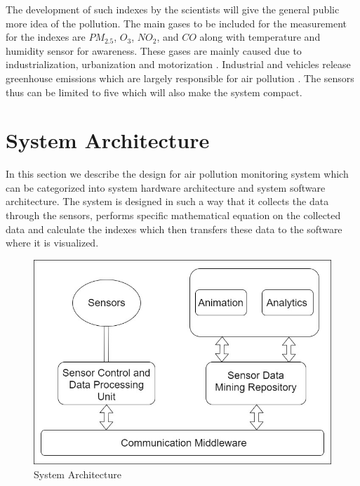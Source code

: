 The development of such indexes by the scientists will give the general public more idea of the pollution. The main gases to be included for the measurement for the indexes are  $PM_{2.5}$, $O_3$, $NO_2$, and $CO$ along with temperature and humidity sensor for awareness. These gases are mainly caused due to industrialization, urbanization and motorization \cite{Saha1952}. Industrial and vehicles release greenhouse emissions which are largely responsible for air pollution \cite{ internet}. The sensors thus can be limited to five which will also make the system compact.

\section{System Architecture}
    
     In this section we describe the design for air pollution monitoring system which can be categorized into system hardware architecture and system software architecture. The system is designed in such a way that it collects the data through the sensors, performs specific mathematical equation on the collected data and calculate the indexes which then transfers these data to the software where it is visualized. 

     \begin{figure}[h]
      \begin{center}
      \includegraphics[scale=0.70]{images/figure2.png}
      \end{center}
      \caption{System Architecture}
      \label{overview}
  
    \end{figure}

